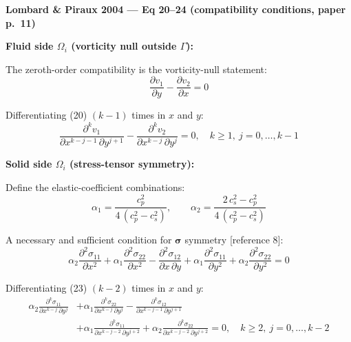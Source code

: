 \textbf{Lombard \& Piraux 2004 --- Eq 20--24 (compatibility conditions, paper p.\ 11)}

\medskip

\textbf{Fluid side $\Omega_i$ (vorticity null outside $\Gamma$):}

The zeroth-order compatibility is the vorticity-null statement:
\begin{equation*}
  \frac{\partial v_1}{\partial y} - \frac{\partial v_2}{\partial x} = 0
  \tag{20}
\end{equation*}

Differentiating (20) $(k-1)$ times in $x$ and $y$:
\begin{equation*}
  \frac{\partial^k v_1}{\partial x^{k-j-1}\,\partial y^{j+1}}
  -
  \frac{\partial^k v_2}{\partial x^{k-j}\,\partial y^{j}}
  = 0,\quad k \geq 1,\ j = 0, \ldots, k-1
  \tag{21}
\end{equation*}

\medskip

\textbf{Solid side $\Omega_i$ (stress-tensor symmetry):}

Define the elastic-coefficient combinations:
\begin{equation*}
  \alpha_1 = \frac{c_p^{2}}{4\,(c_p^{2} - c_s^{2})},\qquad
  \alpha_2 = \frac{2\,c_s^{2} - c_p^{2}}{4\,(c_p^{2} - c_s^{2})}
  \tag{22}
\end{equation*}

A necessary and sufficient condition for $\boldsymbol{\sigma}$ symmetry [reference 8]:
\begin{equation*}
  \alpha_2 \frac{\partial^2 \sigma_{11}}{\partial x^2}
  + \alpha_1 \frac{\partial^2 \sigma_{22}}{\partial x^2}
  - \frac{\partial^2 \sigma_{12}}{\partial x\,\partial y}
  + \alpha_1 \frac{\partial^2 \sigma_{11}}{\partial y^2}
  + \alpha_2 \frac{\partial^2 \sigma_{22}}{\partial y^2}
  = 0
  \tag{23}
\end{equation*}

Differentiating (23) $(k-2)$ times in $x$ and $y$:
\begin{equation*}
\begin{aligned}
  \alpha_2 \frac{\partial^k \sigma_{11}}{\partial x^{k-j}\,\partial y^{j}}
  &+ \alpha_1 \frac{\partial^k \sigma_{22}}{\partial x^{k-j}\,\partial y^{j}}
  - \frac{\partial^k \sigma_{12}}{\partial x^{k-j-1}\,\partial y^{j+1}} \\
  &+ \alpha_1 \frac{\partial^k \sigma_{11}}{\partial x^{k-j-2}\,\partial y^{j+2}}
  + \alpha_2 \frac{\partial^k \sigma_{22}}{\partial x^{k-j-2}\,\partial y^{j+2}}
  = 0,\quad k \geq 2,\ j = 0, \ldots, k-2
\end{aligned}
\tag{24}
\end{equation*}

